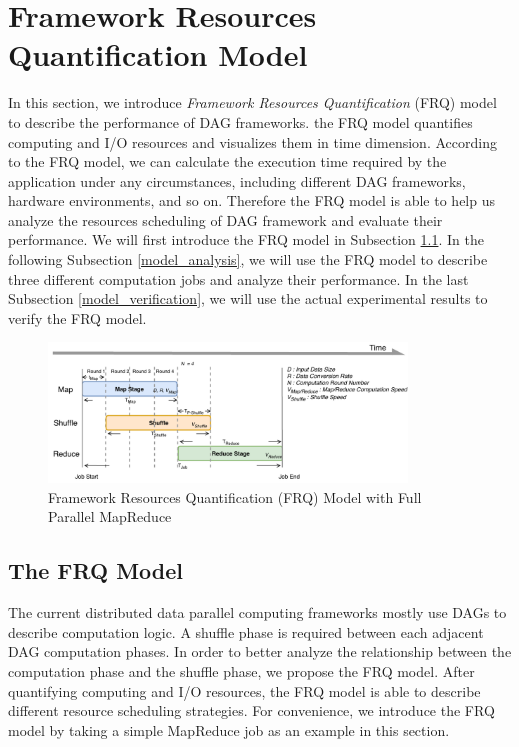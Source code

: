 {\color{blue}
\section{Framework Resources Quantification Model}\label{model}

In this section, we introduce \textit{Framework Resources Quantification} (FRQ) model to describe the performance of DAG frameworks.
the FRQ model quantifies computing and I/O resources and visualizes them in time dimension. According to the FRQ model, we can calculate the execution time required by the application under any circumstances, including different DAG frameworks, hardware environments, and so on. Therefore the FRQ model is able to help us analyze the resources scheduling of DAG framework and evaluate their performance. We will first introduce the FRQ model in Subsection \ref{model_overview}. In the following Subsection \ref{model_analysis}, we will use the FRQ model to describe three different computation jobs and analyze their performance. In the last Subsection \ref{model_verification}, we will use the actual experimental results to verify the FRQ model.

\begin{figure}
    \centering
	\includegraphics[width=0.85\textwidth]{fig/model_basic}
	\caption{\color{blue}Framework Resources Quantification (FRQ) Model with Full Parallel MapReduce}
    \label{fig:model_basic}
    \vspace{-1em}
\end{figure}

\subsection{The FRQ Model}\label{model_overview}
The current distributed data parallel computing frameworks mostly use DAGs to describe computation logic. A shuffle phase is required between each adjacent DAG computation phases. In order to better analyze the relationship between the computation phase and the shuffle phase, we propose the FRQ model. After quantifying computing and I/O resources, the FRQ model is able to describe different resource scheduling strategies. For convenience, we introduce the FRQ model by taking a simple MapReduce job as an example in this section.

}
